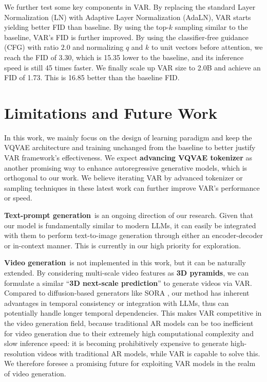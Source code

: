  We further test some key components in VAR. By replacing the standard Layer Normalization (LN) with Adaptive Layer Normalization (AdaLN), VAR starts yielding better FID than baseline. By using the top-$k$ sampling similar to the baseline, VAR's FID is further improved. By using the classifier-free guidance (CFG) with ratio $2.0$ and normalizing $q$ and $k$ to unit vectors before attention, we reach the FID of 3.30, which is 15.35 lower to the baseline, and its inference speed is still 45 times faster. We finally scale up VAR size to 2.0B and achieve an FID of 1.73. This is 16.85 better than the baseline FID.

    

\section{Limitations and Future Work} \label{sec:limit}
\vspace{-2pt}

In this work, we mainly focus on the design of learning paradigm and keep the VQVAE architecture and training unchanged from the baseline \cite{vqgan} to better justify VAR framework's effectiveness. We expect \textbf{advancing VQVAE tokenizer} \cite{movq,fsq,magvit2} as another promising way to enhance autoregressive generative models, which is orthogonal to our work. We believe iterating VAR by advanced tokenizer or sampling techniques in these latest work can further improve VAR's performance or speed.

\textbf{Text-prompt generation}\, is an ongoing direction of our research. Given that our model is fundamentally similar to modern LLMs, it can easily be integrated with them to perform text-to-image generation through either an encoder-decoder or in-context manner. This is currently in our high priority for exploration.

\textbf{Video generation}\, is not implemented in this work, but it can be naturally extended. By considering multi-scale video features as \textbf{3D pyramids}, we can formulate a similar ``\textbf{3D next-scale prediction}'' to generate videos via VAR.
Compared to diffusion-based generators like SORA \cite{sora}, our method has inherent advantages in temporal consistency or integration with LLMs, thus can potentially handle longer temporal dependencies.
This makes VAR competitive in the video generation field, because traditional AR models can be too inefficient for video generation due to their extremely high computational complexity and slow inference speed: it is becoming prohibitively expensive to generate high-resolution videos with traditional AR models, while VAR is capable to solve this.
We therefore foresee a promising future for exploiting VAR models in the realm of video generation.

